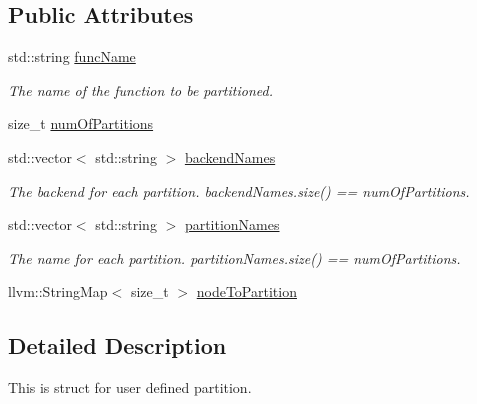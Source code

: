 \subsection*{Public Attributes}
\begin{DoxyCompactItemize}
\item 
\mbox{\label{structglow_1_1runtime_1_1_partition_config_ac8482eb011396bdcc81c9eeacc62530a}} 
std\+::string \hyperlink{structglow_1_1runtime_1_1_partition_config_ac8482eb011396bdcc81c9eeacc62530a}{func\+Name}
\begin{DoxyCompactList}\small\item\em The name of the function to be partitioned. \end{DoxyCompactList}\item 
size\+\_\+t \hyperlink{structglow_1_1runtime_1_1_partition_config_a71d054f8aae8baf57efcee229470c8cb}{num\+Of\+Partitions}
\item 
\mbox{\label{structglow_1_1runtime_1_1_partition_config_a6616e587419e2669246b44ac9ccffa08}} 
std\+::vector$<$ std\+::string $>$ \hyperlink{structglow_1_1runtime_1_1_partition_config_a6616e587419e2669246b44ac9ccffa08}{backend\+Names}
\begin{DoxyCompactList}\small\item\em The backend for each partition. backend\+Names.\+size() == num\+Of\+Partitions. \end{DoxyCompactList}\item 
\mbox{\label{structglow_1_1runtime_1_1_partition_config_a2323e78db5023db33dd17009764c3704}} 
std\+::vector$<$ std\+::string $>$ \hyperlink{structglow_1_1runtime_1_1_partition_config_a2323e78db5023db33dd17009764c3704}{partition\+Names}
\begin{DoxyCompactList}\small\item\em The name for each partition. partition\+Names.\+size() == num\+Of\+Partitions. \end{DoxyCompactList}\item 
llvm\+::\+String\+Map$<$ size\+\_\+t $>$ \hyperlink{structglow_1_1runtime_1_1_partition_config_a9c69e065e0deae286621ec4f5960b120}{node\+To\+Partition}
\end{DoxyCompactItemize}


\subsection{Detailed Description}
This is struct for user defined partition. 


